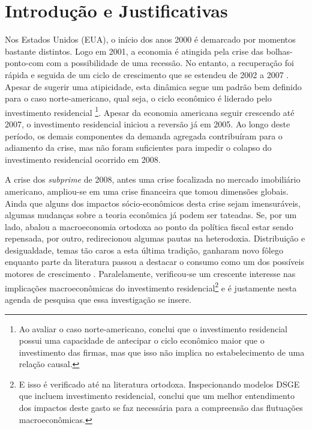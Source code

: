 \section{Introdução e Justificativas}\label{Intro}





Nos Estados Unidos (EUA), o início dos anos 2000 é demarcado por momentos bastante distintos. Logo em 2001, a economia é atingida pela crise das bolhas-ponto-com com a possibilidade de uma recessão. No entanto, a recuperação foi rápida e seguida de um ciclo de crescimento que se estendeu de 2002 a 2007 \cite{cagnin_o_2007}. Apesar de sugerir uma atipicidade, esta dinâmica segue um padrão bem definido para o caso norte-americano, qual seja, o ciclo econômico é liderado pelo investimento residencial \cites{green_follow_1997}{leamer_housing_2007}{fiebiger_trend_2017}\footnote{
	Ao avaliar o caso norte-americano, \textcite{green_follow_1997} conclui que o investimento residencial possui uma capacidade  de antecipar o ciclo econômico maior que o investimento das firmas, mas que isso não implica no estabelecimento de uma relação causal. 
}. Apesar da economia americana seguir crescendo até 2007, o investimento residencial iniciou a reversão já em 2005. Ao longo deste período, os demais componentes da demanda agregada contribuíram para o adiamento da crise, mas não foram suficientes para impedir o colapso do investimento residencial ocorrido em 2008. 

A crise dos \textit{subprime} de 2008, antes uma crise focalizada no mercado imobiliário americano, ampliou-se em uma crise financeira que tomou dimensões globais. Ainda que alguns dos impactos sócio-econômicos desta crise sejam imensuráveis, algumas mudanças sobre a teoria econômica já podem ser tateadas. Se, por um lado, abalou a macroeconomia ortodoxa ao ponto da política fiscal estar sendo repensada, por outro, redirecionou algumas pautas na heterodoxia. Distribuição e desigualdade, temas tão caros a esta última tradição, ganharam novo fôlego \cites{carvalho_personal_2016}{ederer_will_2019} enquanto parte da literatura passou a destacar o consumo como um dos possíveis motores de crescimento \cite{brochier_macroeconomics_2017}. Paralelamente, verificou-se um crescente interesse nas implicações macroeconômicas do investimento residencial\footnote{E isso é verificado até na literatura ortodoxa. Inspecionando modelos DSGE que incluem investimento residencial, \textcite{iacoviello_housing_2010} conclui que um melhor entendimento dos impactos deste gasto se faz necessária para a compreensão das flutuações macroeconômicas.} \cite{fiebiger_semi-autonomous_2018} e é justamente nesta agenda de pesquisa que essa investigação se insere. 

